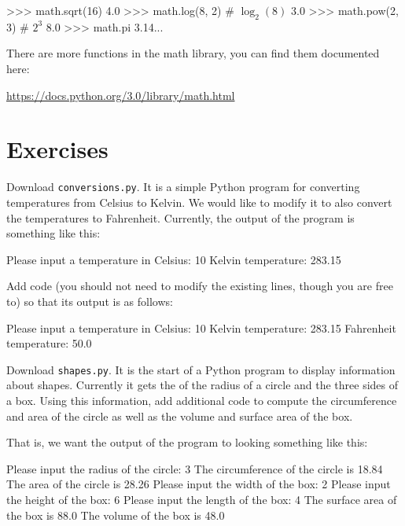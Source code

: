 \documentclass[11pt]{cselabheader}
\begin{document}
\begin{pyconcode}
>>> math.sqrt(16)
4.0
>>> math.log(8, 2) # $\log_2(8)$
3.0
>>> math.pow(2, 3) # $2^3$
8.0
>>> math.pi
3.14...
\end{pyconcode}

There are more functions in the math library, you can find them documented here:
\begin{center}
\url{https://docs.python.org/3.0/library/math.html}
\end{center}

\pagebreak

\section{Exercises}

\begin{ex}[conversions.py] Download \texttt{conversions.py}. It is a simple
  Python program for converting temperatures from Celsius to Kelvin. We would
  like to modify it to also convert the temperatures to Fahrenheit. Currently,
  the output of the program is something like this:

  \begin{verbatimcode}
Please input a temperature in Celsius: 10
Kelvin temperature: 283.15
  \end{verbatimcode}

  Add code (you should not need to modify the existing lines, though you are free
  to) so that its output is as follows:

  \begin{verbatimcode}
Please input a temperature in Celsius: 10
Kelvin temperature: 283.15
Fahrenheit temperature: 50.0
  \end{verbatimcode}
\end{ex}

\begin{ex}[shapes.py] Download \texttt{shapes.py}. It is the start of a Python
  program to display information about shapes. Currently it gets the of the
  radius of a circle and the three sides of a box. Using this information, add
  additional code to compute the circumference and area of the circle as well as
  the volume and surface area of the box.

  That is, we want the output of the program to looking something like this:

  \begin{verbatimcode}
Please input the radius of the circle: 3
The circumference of the circle is 18.84
The area of the circle is 28.26
Please input the width of the box: 2
Please input the height of the box: 6
Please input the length of the box: 4
The surface area of the box is 88.0
The volume of the box is 48.0
  \end{verbatimcode}
\end{ex}
\end{document}
